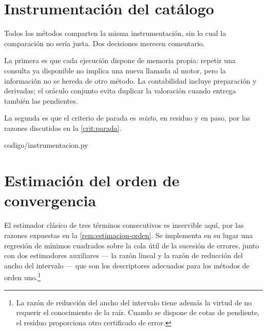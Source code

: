 \iffalse

\section{Instrumentación del catálogo}

Todos los métodos comparten la misma instrumentación, sin lo cual la comparación
no sería justa. Dos decisiones merecen comentario.

La primera es que cada ejecución dispone de memoria propia: repetir una consulta
ya disponible no implica una nueva llamada al motor, pero la información no se
hereda de otro método. La contabilidad incluye preparación y derivadas; el oráculo
conjunto evita duplicar la valoración cuando entrega también las pendientes.

La segunda es que el criterio de parada es \emph{mixto}, en residuo y en paso, por
las razones discutidas en la \cref{crit:parada}.

%
{codigo/instrumentacion.py}

\section{Estimación del orden de convergencia}

El estimador clásico de tres términos consecutivos es inservible aquí, por las
razones expuestas en la \cref{rem:estimacion-orden}. Se implementa en su lugar una
regresión de mínimos cuadrados sobre la cola útil de la sucesión de errores, junto
con dos estimadores auxiliares --- la razón lineal y la razón de reducción del ancho
del intervalo --- que son los descriptores adecuados para los métodos de orden
uno.\footnote{La razón de reducción del ancho del intervalo tiene además la virtud
de no requerir el conocimiento de la raíz. Cuando se dispone de cotas de
pendiente, el residuo proporciona otro certificado de error.}



